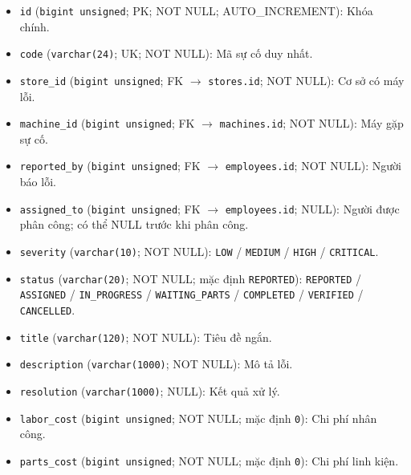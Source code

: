 \begin{itemize}

\item \texttt{id} (\texttt{bigint unsigned}; PK; NOT NULL; AUTO_INCREMENT): Khóa chính.

\item \texttt{code} (\texttt{varchar(24)}; UK; NOT NULL): Mã sự cố duy nhất.

\item \texttt{store\_id} (\texttt{bigint unsigned}; FK $\rightarrow$ \texttt{stores.id}; NOT NULL): Cơ sở có máy lỗi.

\item \texttt{machine\_id} (\texttt{bigint unsigned}; FK $\rightarrow$ \texttt{machines.id}; NOT NULL): Máy gặp sự cố.

\item \texttt{reported\_by} (\texttt{bigint unsigned}; FK $\rightarrow$ \texttt{employees.id}; NOT NULL): Người báo lỗi.

\item \texttt{assigned\_to} (\texttt{bigint unsigned}; FK $\rightarrow$ \texttt{employees.id}; NULL): Người được phân công; có thể NULL trước khi phân công.

\item \texttt{severity} (\texttt{varchar(10)}; NOT NULL): \texttt{LOW} / \texttt{MEDIUM} / \texttt{HIGH} / \texttt{CRITICAL}.

\item \texttt{status} (\texttt{varchar(20)}; NOT NULL; mặc định \texttt{REPORTED}): \texttt{REPORTED} / \texttt{ASSIGNED} / \texttt{IN\_PROGRESS} / \texttt{WAITING\_PARTS} / \texttt{COMPLETED} / \texttt{VERIFIED} / \texttt{CANCELLED}.

\item \texttt{title} (\texttt{varchar(120)}; NOT NULL): Tiêu đề ngắn.

\item \texttt{description} (\texttt{varchar(1000)}; NOT NULL): Mô tả lỗi.

\item \texttt{resolution} (\texttt{varchar(1000)}; NULL): Kết quả xử lý.

\item \texttt{labor\_cost} (\texttt{bigint unsigned}; NOT NULL; mặc định \texttt{0}): Chi phí nhân công.

\item \texttt{parts\_cost} (\texttt{bigint unsigned}; NOT NULL; mặc định \texttt{0}): Chi phí linh kiện.


\end{itemize}
